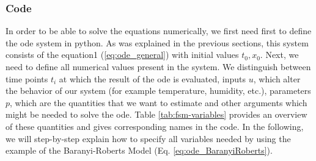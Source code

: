 \documentclass[10pt,A4paper]{article}
\begin{document}
\subsubsection*{Code}
In order to be able to solve the equations numerically, we first need first to define the \ac{ode} system in python.
As was explained in the previous sections, this system consists of the equation1 (\ref{eq:ode_general}) with initial values $t_0,x_0$.
Next, we need to define all numerical values present in the system.
We distinguish between time points $t_i$ at which the result of the \ac{ode} is evaluated, inputs $u$, which alter the behavior of our system (for example temperature, humidity, etc.), parameters $p$, which are the quantities that we want to estimate and other arguments which might be needed to solve the \ac{ode}.
Table \ref{tab:fsm-variables} provides an overview of these quantities and gives corresponding names in the code.
In the following, we will step-by-step explain how to specify all variables needed by using the example of the Baranyi-Roberts Model (Eq. \ref{eq:ode_BaranyiRoberts}).
\end{document}
